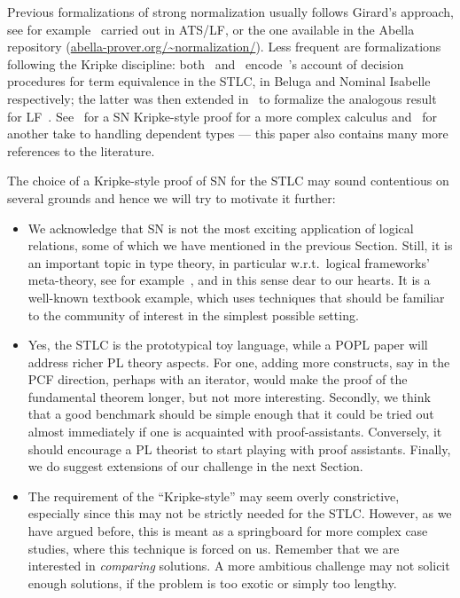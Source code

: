 \smallskip

Previous formalizations of strong normalization usually follows
Girard's approach, see for example~\cite{DonnellyX07} carried out in
ATS/LF, or the one available in the Abella repository
(\url{abella-prover.org/~normalization/}).  Less frequent are
formalizations following the Kripke discipline: both~\cite{CaveP15}
and~\cite{NarbouxU08} encode~\cite{Crary:ATAPL}'s account of decision
procedures for term equivalence in the STLC, in Beluga and Nominal
Isabelle respectively; the latter was then extended
in~\citep{Urban2011} to formalize the analogous result for
LF~\citep{Harper03tocl}. See~\citep{AbelV14} for a SN Kripke-style
proof for a more complex calculus and~\citep{Rabe:2013} for another
take to handling dependent types --- this paper also contains many
more references to the literature.



The choice of a Kripke-style proof of SN for the STLC may sound
contentious on several grounds and hence we will try to motivate it
further:

\begin{itemize}
\item We acknowledge that SN is not the most exciting application of logical
  relations, some of which we have mentioned in the previous Section. Still, it
  is an important topic in type theory, in particular w.r.t.\ logical
  frameworks' meta-theory, see for example~\citep{AltenkirchK16}, and
  in this sense dear to our hearts. It is  a well-known textbook example,
  which uses techniques that should be familiar to the community of
  interest in the simplest possible setting.
\item Yes, the STLC is the prototypical toy language, while a
  POPL paper will address richer PL theory
  aspects. For one, adding more constructs, say in the PCF direction,
  perhaps with an iterator, would make the proof of the fundamental
  theorem longer, but not more interesting. Secondly, we think that a
  good benchmark should be simple  enough that it
  could be tried out almost immediately if one is acquainted with
  proof-assistants. Conversely, it should encourage a PL theorist to
  start playing with proof assistants. Finally, we do suggest extensions
  of our challenge in the next Section.
\item The requirement of the ``Kripke-style'' may seem overly
  constrictive, especially since this may  not be strictly needed for
  the STLC\@. However, as we have argued before, this is meant as a
  springboard for more complex case studies, where this technique
  is forced on us. Remember that we are interested in \emph{comparing} solutions. A more
  ambitious challenge may not solicit enough solutions, if the problem
  is too exotic or simply too lengthy.
\end{itemize}



